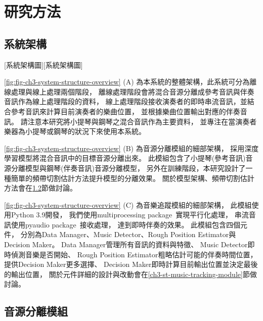 \documentclass[class=NCU_thesis, crop=false]{standalone}
\begin{document}
\chapter{研究方法}

\section{系統架構} \label{ch3-st-system-structure}
[系統架構圖][系統架構圖]

\cref{fig:fig-ch3-system-structure-overview} (A)
為本系統的整體架構，此系統可分為離線處理與線上處理兩個階段，
離線處理階段會將混合音源分離成參考音訊與伴奏音訊作為線上處理階段的資料，
線上處理階段接收演奏者的即時串流音訊，並結合參考音訊來計算目前演奏者的樂曲位置，
並根據樂曲位置輸出對應的伴奏音訊。
請注意本研究將小提琴與鋼琴之混合音訊作為主要資料，
並專注在當演奏者樂器為小提琴或鋼琴的狀況下來使用本系統。

\cref{fig:fig-ch3-system-structure-overview} (B)
為音源分離模組的細部架構，
採用深度學習模型將混合音訊中的目標音源分離出來。
此模組包含了小提琴(參考音訊)音源分離模型與鋼琴(伴奏音訊)音源分離模型，
另外在訓練階段，本研究設計了一種簡單的頻帶切割估計方法提升模型的分離效果。
關於模型架構、頻帶切割估計方法會在\ref{ch3-st-mss-module}節做討論。

\cref{fig:fig-ch3-system-structure-overview} (C)
為音樂追蹤模組的細部架構，
此模組使用Python 3.9開發，
我們使用multiprocessing package~\cite{python2024multiprocessing}實現平行化處理，
串流音訊使用pyaudio package~\cite{python2024pyaudio}接收處理，
達到即時伴奏的效果。
此模組包含四個元件，
分別為Data Manager、Music Detector、Rough Position Estimator與Decision Maker。
Data Manager管理所有音訊的資料與特徵、
Music Detector即時偵測音樂是否開始、
Rough Position Estimator粗略估計可能的伴奏時間位置，提供Decision Maker更多選擇、
Decision Maker即時計算目前輸出位置並決定最後的輸出位置，
關於元件詳細的設計與改動會在\ref{ch3-st-music-tracking-module}節做討論。

\pagebreak

\section{音源分離模組} \label{ch3-st-mss-module}
\end{document}
